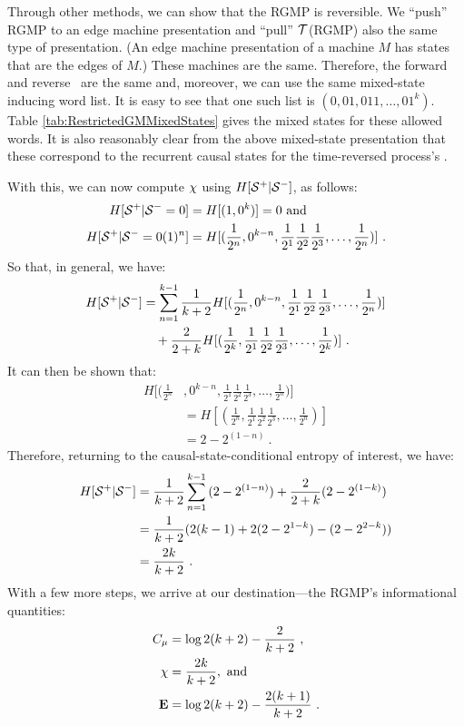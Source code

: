 \documentclass[prl,twocolumn,showpacs,superscriptaddress,preprintnumbers,floatfix]{revtex4}
\theoremstyle{plain}   \newtheorem{Lem}{Lemma}
\theoremstyle{plain} 	\newtheorem{Cor}{Corollary}
\theoremstyle{plain} 	\newtheorem{The}{Theorem}
\theoremstyle{plain} 	\newtheorem{Prop}{Proposition}
\theoremstyle{plain} 	\newtheorem*{Conj}{Conjecture}
\theoremstyle{plain}	\newtheorem*{Rem}{Remark}
\theoremstyle{plain}	\newtheorem*{Def}{Definition}
\theoremstyle{plain}	\newtheorem*{Not}{Notation}
\begin{document}
Through other methods, we can show that the RGMP is reversible. We ``push'' RGMP
to an edge machine presentation and ``pull'' $\mathcal{T}$(RGMP) also the same type of
presentation. (An edge machine presentation of a machine $M$ has states that
are the edges of $M$.) These machines are the same. Therefore, the forward and
reverse \eMs\ are the same and, moreover, we can use the same mixed-state
inducing word list. It is easy to see that one such list is
$(0,01,011,\ldots,01^k)$. Table \ref{tab:RestrictedGMMixedStates} gives the
mixed states for these allowed words. It is also reasonably clear from the above
mixed-state presentation that these correspond to the recurrent causal states
for the time-reversed process's \eM.

With this, we can now compute $\chi$ using
$H[{\mathcal{S}}^{+} | {\mathcal{S}}^{-}]$, as follows:
\begin{align*}
H[{\mathcal{S}}^{+} | {\mathcal{S}}^{-} = 0] &=  H[(1, 0^k)] = 0 ~\mathrm{and}\\
H[{\mathcal{S}}^{+} | {\mathcal{S}}^{-} = 0(1)^n]
  &= H[(\frac{1}{2^{n}}, 0^{k-n}, \frac{1}{2^1} \frac{1}{2^2}
  \frac{1}{2^3}, \ldots,  \frac{1}{2^{n}})] ~.
\end{align*}
So that, in general, we have:
\begin{align*}
H[{\mathcal{S}}^{+} | {\mathcal{S}}^{-}]
  & = \sum_{n=1}^{k-1}{\frac{1}{k+2} H[(\frac{1}{2^{n}}, 0^{k-n},
  \frac{1}{2^1} \frac{1}{2^2} \frac{1}{2^3}, \ldots,  \frac{1}{2^{n}})]}\\
  & \quad
  + \frac{2}{2+k} H[(\frac{1}{2^{k}}, \frac{1}{2^1} \frac{1}{2^2} \frac{1}{2^3},
  \ldots,  \frac{1}{2^{k}})] ~.
\end{align*}
It can then be shown that:
\begin{align*}
H[(\frac{1}{2^{n}} & , 0^{k-n}, \frac{1}{2^1} \frac{1}{2^2} \frac{1}{2^3},
  \ldots, \frac{1}{2^{n}})] \\
  & = H[(\frac{1}{2^{n}}, \frac{1}{2^1} \frac{1}{2^2} \frac{1}{2^3}, \ldots,
  \frac{1}{2^{n}})] \\
  & = 2 - 2^{(1-n)} ~.
\end{align*}
Therefore, returning to the causal-state-conditional entropy of interest,
we have:
\begin{align*}
H[{\mathcal{S}}^{+} | {\mathcal{S}}^{-}] &=
  \frac{1}{k+2}\sum_{n=1}^{k-1}{(2 - 2^{(1-n)})} + \frac{2}{2+k} (2 - 2^{(1-k)})\\
  &= \frac{1}{k+2}(2(k-1) + 2(2-2^{1-k}) - (2-2^{2-k}))\\
  &= \frac{2k}{k+2} ~.
\end{align*}
With a few more steps, we arrive at our destination---the
RGMP's informational quantities:
\begin{align*}
C_\mu & = \log2(k+2) - \frac{2}{k+2} ~,\\ 
\chi  & = \frac{2k}{k+2}, ~\mathrm{and}\\
{\bf E}  & = \log2(k+2) - \frac{2(k+1)}{k+2} ~.
\end{align*}
\end{document}
